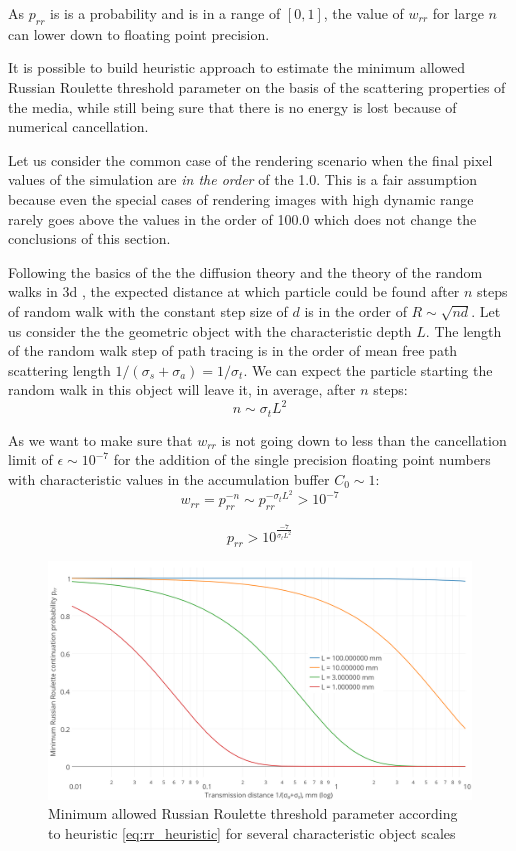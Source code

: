 As $p_{rr}$ is is a probability and is in a range of $[0,1]$, the value of $w_{rr}$ for large $n$
can lower down to floating point precision.

It is possible to build heuristic approach to estimate the minimum allowed Russian Roulette
threshold parameter on the basis of the scattering properties of the media, while still being sure
that there is no energy is lost because of numerical cancellation.

Let us consider the common case of the rendering scenario when the final pixel values of the
simulation are \emph{in the order} of the 1.0. This is a fair assumption because even the special
cases of rendering images with high dynamic range rarely goes above the values in the order of 100.0
which does not change the conclusions of this section.

Following the basics of the the diffusion theory and the theory of the random walks in 3d
\cite{PRE:8383976}, the expected distance at which particle could be found after $n$ steps of random
walk with the constant step size of $d$ is in the order of $R\sim\sqrt{nd}$. Let us consider the the
geometric object with the characteristic depth $L$. The length of the random walk step of path
tracing is in the order of mean free path scattering length $1/(\sigma_s+\sigma_a)=1/\sigma_t$. We
can expect the particle starting the random walk in this object will leave it, in average, after $n$
steps:
\begin{equation}
n\sim\sigma_tL^2
\end{equation}

As we want to make sure that $w_{rr}$ is not going down to less than the cancellation limit of
$\epsilon\sim10^{-7}$ for the addition of the single precision floating point numbers with
characteristic values in the accumulation buffer $C_0\sim1$:
\[
w_{rr} = p_{rr}^{-n} \sim p_{rr}^{-\sigma_tL^2} > 10^{-7}
\]

\begin{equation}
\label{eq:rr_heuristic}
p_{rr} > 10^{\frac{-7}{\sigma_tL^2}}
\end{equation}

\begin{figure}[h]
    \centering
    \includegraphics[width=\textwidth]{imgs/plots/rr_heuristic}
    \caption{Minimum allowed Russian Roulette threshold parameter according to heuristic
    \ref{eq:rr_heuristic} for several characteristic object scales}
    \label{fig:rr_heuristic}
\end{figure}

